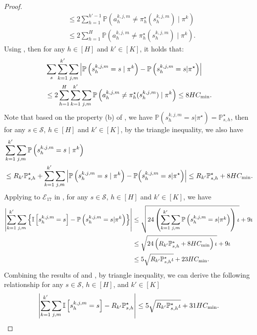 \documentclass{article}
\begin{document}
\begin{proof}
\begin{align*}
&\leq   2 \sum_{h=1}^{h'-1}\mathbb{P}\left(a_h^{k,j,m} \neq \pi_h^{\star}(s_h^{k,j,m})\mid \pi^k\right) \nonumber\\
&\leq 2 \sum_{h=1}^{H}\mathbb{P}\left(a_h^{k,j,m} \neq \pi_h^{\star}(s_h^{k,j,m})\mid \pi^k\right) .
\end{align*}
Using , then for any $h \in [H]$ and $k' \in [K]$, it holds that:
\begin{align*}
    &\sum_{s}\sum_{k = 1}^{k'} \sum_{j,m}\left|\mathbb{P}\left(s_{h}^{k,j,m} = s\mid \pi^k\right) - \mathbb{P}\left(s_{h}^{k,j,m} = s|\pi^{\star}\right)\right| \\
&\leq   2\sum_{h=1}^H\sum_{k = 1}^{k'} \sum_{j,m}\mathbb{P}\left(a_h^{k,j,m} \neq \pi_h^{\star}(s_h^{k,j,m})\mid \pi^k\right) \leq  8HC_{\textnormal{min}}.
\end{align*}
Note that based on the property (b) of , we have $\mathbb{P}(s_{h}^{k,j,m} = s|\pi^{\star}) = \mathbb{P}_{s,h}^{\star} $, then for any $s \in \mathcal{S}$, $h \in [H]$ and $k' \in [K]$, by the triangle inequality, we also have
\begin{align}
\label{optimalPP}
    &\sum_{k = 1}^{k'} \sum_{j,m}\mathbb{P}\left(s_{h}^{k,j,m} = s\mid \pi^k\right)\nonumber\\
&\leq  R_{k'}\mathbb{P}_{s,h}^{\star}+\sum_{k = 1}^{k'} \sum_{j,m}\left|\mathbb{P}\left(s_{h}^{k,j,m} = s \mid \pi^k\right) - \mathbb{P}\Big(s_{h}^{k,j,m} = s|\pi^{\star}\Big)\right| \leq  R_{k'}\mathbb{P}_{s,h}^{\star} + 8HC_{\textnormal{min}} .
\end{align}
Applying  to $\mathcal{E}_{17}$ in , for any $s \in \mathcal{S}$, $h \in [H]$ and $k' \in [K]$, we have
\begin{align}
\label{optimalIP}
    \left|\sum_{k = 1}^{k'} \sum_{j,m}\left\{\mathbb{I}\left[s_{h}^{k,j,m} = s\right] - \mathbb{P}\left(s_{h}^{k,j,m} = s | \pi^k\right)\right\}\right|  &\leq \sqrt{24\left(\sum_{k = 1}^{k'} \sum_{j,m}\mathbb{P}\left(s_{h}^{k,j,m} = s | \pi^k\right)\right)\iota} + 9\iota \nonumber\\
    &\leq \sqrt{24\left(R_{k'}\mathbb{P}_{s,h}^{\star} +  8HC_{\textnormal{min}}\right)\iota} + 9\iota \nonumber\\
&\leq 5\sqrt{R_{k'}\mathbb{P}_{s,h}^{\star} \iota} + 23HC_{\textnormal{min}}.
\end{align}
Combining the results of  and , by triangle inequality, we can derive the following relationship for any $s \in \mathcal{S}$, $h \in [H]$, and $k' \in [K]$
\begin{align}
    \label{optimalIO}
        \left|\sum_{k = 1}^{k'} \sum_{j,m}\mathbb{I}\left[s_{h}^{k,j,m} = s\right] - R_{k'}\mathbb{P}_{s,h}^{\star}\right| \leq 5\sqrt{R_{k'}\mathbb{P}_{s,h}^{\star}\iota} + 31HC_{\textnormal{min}}.
    \end{align}


\end{proof}
\end{document}
